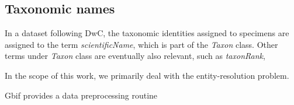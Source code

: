 \subsection{Taxonomic names}
In a dataset following DwC, the taxonomic identities assigned to specimens are assigned to the term \textit{scientificName}, which is part of the \textit{Taxon} class.
Other terms under \textit{Taxon} class are eventually also relevant, such as \textit{taxonRank},



In the scope of this work, we primarily deal with the entity-resolution problem.




Gbif provides a data preprocessing routine %






















